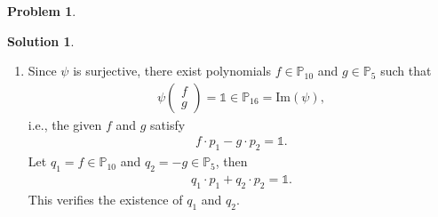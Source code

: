 \documentclass{book}
\theoremstyle{definition}
\newtheorem*{prob*}{Problem}
\newtheorem*{sln*}{Solution}
\newcommand{\ima}{\text{Im}}
\begin{document}
\begin{prob*}
\begin{sln*}
\begin{enumerate}
	\item Since $\psi$ is surjective, there exist polynomials $f\in \mathbb{P}_{10}$ and $g\in \mathbb{P}_5$ such that 
	\begin{align*}
	\psi\begin{pmatrix}
	f\\g
	\end{pmatrix} = \mathbb{1} \in \mathbb{P}_{16} = \ima(\psi),
	\end{align*}
	i.e., the given $f$ and $g$ satisfy
	\begin{align*}
	f\cdot p_1 - g\cdot p_2 = \mathbb{1}.
	\end{align*}
	Let $q_1 = f \in \mathbb{P}_{10}$ and $q_2 = -g \in \mathbb{P}_{5}$, then
	\begin{align*}
	q_1 \cdot p_1 + q_2 \cdot p_2 = \mathbb{1}.
	\end{align*}
	This verifies the existence of $q_1$ and $q_2$. 
\end{enumerate}
\end{sln*}


\end{prob*}


\newpage
\end{document}
